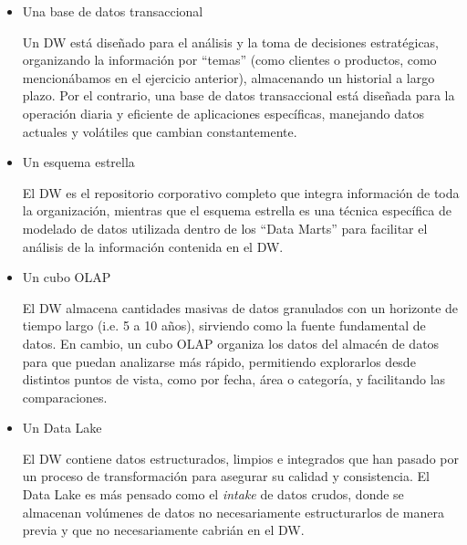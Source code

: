 \begin{itemize}
    \item Una base de datos transaccional

        Un DW está diseñado para el análisis y la toma de decisiones estratégicas, organizando la información por ``temas'' (como clientes o productos, como mencionábamos en el ejercicio anterior), almacenando un historial a largo plazo. Por el contrario, una base de datos transaccional está diseñada para la operación diaria y eficiente de aplicaciones específicas, manejando datos actuales y volátiles que cambian constantemente.

    \item Un esquema estrella

        El DW es el repositorio corporativo completo que integra información de toda la organización, mientras que el esquema estrella es una técnica específica de modelado de datos utilizada dentro de los ``Data Marts'' para facilitar el análisis de la información contenida en el DW.

    \item Un cubo OLAP

        El DW almacena cantidades masivas de datos granulados con un horizonte de tiempo largo (i.e. 5 a 10 años), sirviendo como la fuente fundamental de datos. En cambio, un cubo OLAP organiza los datos del almacén de datos para que puedan analizarse más rápido, permitiendo explorarlos desde distintos puntos de vista, como por fecha, área o categoría, y facilitando las comparaciones.

    \item Un Data Lake

        El DW contiene datos estructurados, limpios e integrados que han pasado por un proceso de transformación para asegurar su calidad y consistencia. El Data Lake es más pensado como el \textit{intake} de datos crudos, donde se almacenan volúmenes de datos no necesariamente estructurarlos de manera previa y que no necesariamente cabrián en el DW.
  \end{itemize}